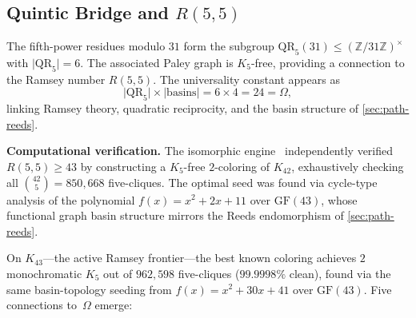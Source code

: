 \documentclass[11pt,a4paper]{article}
\theoremstyle{plain}
\theoremstyle{remark}
\renewcommand{\Omega}{\varOmega}
\newcommand{\Z}{\mathbb{Z}}
\newcommand{\abs}[1]{\lvert #1 \rvert}
\newcommand{\GF}{\mathrm{GF}}
\begin{document}
\subsection{Quintic Bridge and $R(5,5)$}
\label{sec:path-quintic}

The fifth-power residues modulo $31$ form the subgroup
$\mathrm{QR}_5(31)\leq(\Z/31\Z)^\times$ with $\abs{\mathrm{QR}_5}=6$.
The associated Paley graph is $K_5$-free, providing a connection to the
Ramsey number $R(5,5)$.
The universality constant appears as
\[
  \abs{\mathrm{QR}_5}\times\abs{\text{basins}} = 6\times 4 = 24 = \Omega,
\]
linking Ramsey theory, quadratic reciprocity, and the basin structure of
\cref{sec:path-reeds}.

\medskip
\noindent\textbf{Computational verification.}\quad
The isomorphic engine~\cite{isomorphic-engine2026} independently
verified $R(5,5)\geq 43$ by constructing a $K_5$-free $2$-coloring of
$K_{42}$, exhaustively checking all $\binom{42}{5}=850{,}668$
five-cliques.  The optimal seed was found via cycle-type analysis of
the polynomial $f(x)=x^2+2x+11$ over $\GF(43)$, whose functional
graph basin structure mirrors the Reeds endomorphism of
\cref{sec:path-reeds}.

On $K_{43}$---the active Ramsey frontier---the best known coloring
achieves $2$ monochromatic $K_5$ out of $962{,}598$ five-cliques
($99.9998\%$ clean), found via the same basin-topology seeding from
$f(x)=x^2+30x+41$ over $\GF(43)$.  Five connections to~$\Omega$ emerge:
\end{document}
